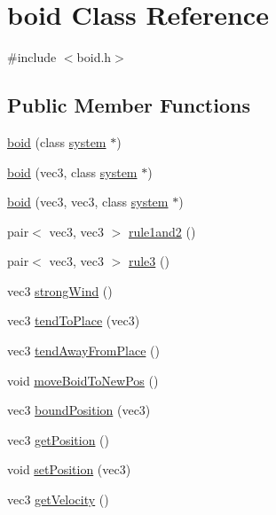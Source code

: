 \hypertarget{classboid}{}\section{boid Class Reference}
\label{classboid}


{\ttfamily \#include $<$boid.\+h$>$}

\subsection*{Public Member Functions}
\begin{DoxyCompactItemize}
\item 
\mbox{\hyperlink{classboid_a679e9c54388b10b996afc304736f7f9f}{boid}} (class \mbox{\hyperlink{classsystem}{system}} $\ast$)
\item 
\mbox{\hyperlink{classboid_a8e106f9109011ffe00204fb5b83f12c2}{boid}} (vec3, class \mbox{\hyperlink{classsystem}{system}} $\ast$)
\item 
\mbox{\hyperlink{classboid_acd0b39c9563ab3e0f6f4cfbed86fa113}{boid}} (vec3, vec3, class \mbox{\hyperlink{classsystem}{system}} $\ast$)
\item 
pair$<$ vec3, vec3 $>$ \mbox{\hyperlink{classboid_abbb96bf34e78a462af8d9c66e1f8427f}{rule1and2}} ()
\item 
pair$<$ vec3, vec3 $>$ \mbox{\hyperlink{classboid_a71d26e63c117b2d69364076a9d1cf011}{rule3}} ()
\item 
vec3 \mbox{\hyperlink{classboid_abf305f09cde8ce66b82a7a671fdcd744}{strong\+Wind}} ()
\item 
vec3 \mbox{\hyperlink{classboid_a09fbb8f0a0e58c5fa53c95cbd517fe95}{tend\+To\+Place}} (vec3)
\item 
vec3 \mbox{\hyperlink{classboid_a93134d78fea29397c53083bb44d54615}{tend\+Away\+From\+Place}} ()
\item 
void \mbox{\hyperlink{classboid_ab87a1586c29b4d180c2ca0b3e4d4ab0c}{move\+Boid\+To\+New\+Pos}} ()
\item 
vec3 \mbox{\hyperlink{classboid_adc3958d8172527063c6c181fce9136ff}{bound\+Position}} (vec3)
\item 
vec3 \mbox{\hyperlink{classboid_a2c5263307b1229f318c6a4adb9d9aed6}{get\+Position}} ()
\item 
void \mbox{\hyperlink{classboid_acb8f49d32e4a39327f990914b2520f11}{set\+Position}} (vec3)
\item 
vec3 \mbox{\hyperlink{classboid_a2d8189207adddd9ac37f0cf3be28da5c}{get\+Velocity}} ()
\item 

\end{DoxyCompactItemize}
